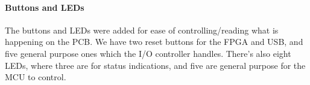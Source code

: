 \paragraph{Buttons and LEDs}

The buttons and LEDs were added for ease of controlling/reading what is
happening on the PCB. We have two reset buttons for the FPGA and USB, and five
general purpose ones which the I/O controller handles. There's also eight LEDs,
where three are for status indications, and five are general purpose for the MCU
to control.
